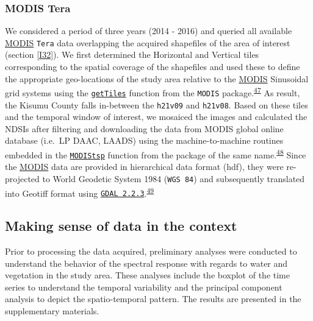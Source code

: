 \documentclass[12pt,oneside]{article}
\begin{document}
\hypertarget{I33}{%
\subsubsection{MODIS Tera}\label{I33}}

We considered a period of three years (2014 - 2016) and queried all available \href{https://terra.nasa.gov/about/terra-instruments/modis}{MODIS} \texttt{Tera} data overlapping the acquired shapefiles of the area of interest (section \ref{I32}). We first determined the Horizontal and Vertical tiles corresponding to the spatial coverage of the shapefiles and used these to define the appropriate geo-locations of the study area relative to the \href{https://terra.nasa.gov/about/terra-instruments/modis}{MODIS} Sinusoidal grid systems using the \href{https://www.rdocumentation.org/packages/MODIS/versions/1.1.4/topics/getTile}{\texttt{getTiles}} function from the \texttt{MODIS} package.\textsuperscript{\protect\hyperlink{ref-Mattiuzzi_and_Detsch_2018}{47}} As result, the Kisumu County falls in-between the \texttt{h21v09} and \texttt{h21v08}. Based on these tiles and the temporal window of interest, we mosaiced the images and calculated the NDSIs after filtering and downloading the data from MODIS global online database (i.e.~LP DAAC, LAADS) using the machine-to-machine routines embedded in the \href{https://www.rdocumentation.org/packages/MODIStsp/versions/1.3.2}{\texttt{MODIStsp}} function from the package of the same name.\textsuperscript{\protect\hyperlink{ref-Busetto_and_ranghetti_2016}{48}} Since the \href{https://terra.nasa.gov/about/terra-instruments/modis}{MODIS} data are provided in hierarchical data format (hdf), they were re-projected to World Geodetic System 1984 (\texttt{WGS\ 84}) and subsequently translated into Geotiff format using \href{https://www.gdal.org/}{\texttt{GDAL\ 2.2.3}}.\textsuperscript{\protect\hyperlink{ref-GDAL_OGRcontributors_2018}{49}}

\hypertarget{I4}{%
\subsection{Making sense of data in the context}\label{I4}}

Prior to processing the data acquired, preliminary analyses were conducted to understand the behavior of the spectral response with regards to water and vegetation in the study area. These analyses include the boxplot of the time series to understand the temporal variability and the principal component analysis to depict the spatio-temporal pattern. The results are presented in the supplementary materials.
\end{document}
